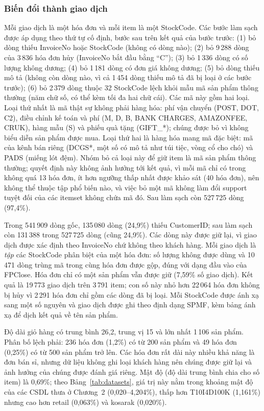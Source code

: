 \subsubsection{Biến đổi thành giao dịch}
Mỗi giao dịch là một hóa đơn và mỗi item là một StockCode. Các bước làm sạch được áp dụng theo thứ tự cố định, bước sau
trên kết quả của bước trước: (1) bỏ dòng thiếu InvoiceNo hoặc StockCode (không có dòng nào); (2) bỏ 9\,288 dòng của
3\,836 hóa đơn hủy (InvoiceNo bắt đầu bằng ``C''); (3) bỏ 1\,336 dòng có số lượng không dương; (4) bỏ 1\,181 dòng có
đơn giá không dương; (5) bỏ dòng thiếu mô tả (không còn dòng nào, vì cả 1\,454 dòng thiếu mô tả đã bị loại ở các bước
trước); (6) bỏ 2\,379 dòng thuộc 32 StockCode lệch khỏi mẫu mã sản phẩm thông thường (năm chữ số, có thể kèm tối đa
hai chữ cái). Các mã này gồm hai loại. Loại thứ nhất là mã thật sự không phải hàng hóa: phí vận chuyển (POST, DOT, C2),
điều chỉnh kế toán và phí (M, D, B, BANK CHARGES, AMAZONFEE, CRUK), hàng mẫu (S) và phiếu quà tặng (GIFT\_*); chúng
được bỏ vì không biểu diễn sản phẩm được mua. Loại thứ hai là hàng hóa mang mã đặc biệt: mã của kênh bán riêng (DCGS*,
một số có mô tả như túi tiệc, vòng cổ cho chó) và PADS (miếng lót đệm). Nhóm bỏ cả loại này để giữ item là mã sản phẩm
thông thường; quyết định này không ảnh hưởng tới kết quả, vì mỗi mã chỉ có trong không quá 13 hóa đơn, ít hơn ngưỡng
thấp nhất được khảo sát (40 hóa đơn), nên không thể thuộc tập phổ biến nào, và việc bỏ một mã không làm đổi support tuyệt
đối của các itemset không chứa mã đó. Sau làm sạch còn 527\,725 dòng (97,4\%).

Trong 541\,909 dòng gốc, 135\,080 dòng (24,9\%) thiếu CustomerID; sau làm sạch còn 131\,388 trong 527\,725 dòng (cũng
24,9\%). Các dòng này được giữ lại, vì giao dịch được xác định theo InvoiceNo chứ không theo khách hàng. Mỗi giao dịch là \emph{tập} các StockCode phân biệt của một hóa đơn: số lượng không được dùng và 10\,471 dòng trùng
mã trong cùng hóa đơn được gộp, đúng với dạng đầu vào của FPClose. Hóa đơn chỉ có một sản phẩm vẫn được giữ (7,59\% số
giao dịch). Kết quả là 19\,773 giao dịch trên 3\,791 item; con số này nhỏ hơn 22\,064 hóa đơn không bị hủy vì 2\,291
hóa đơn chỉ gồm các dòng đã bị loại. Mỗi StockCode được ánh xạ sang một số nguyên và giao dịch được ghi theo định dạng
SPMF, kèm bảng ánh xạ để dịch kết quả về tên sản phẩm.

Độ dài giỏ hàng có trung bình 26,2, trung vị 15 và lớn nhất 1\,106 sản phẩm. Phân bố lệch phải: 236 hóa đơn (1,2\%) có
từ 200 sản phẩm và 49 hóa đơn (0,25\%) có từ 500 sản phẩm trở lên. Các hóa đơn rất dài này nhiều khả năng là đơn bán
sỉ, nhưng dữ liệu không ghi loại khách hàng nên chúng được giữ lại và ảnh hưởng của chúng được đánh giá riêng. Mật độ
(độ dài trung bình chia cho số item) là 0,69\%; theo Bảng~\ref{tab:datasets}, giá trị này nằm trong khoảng mật độ của
các CSDL thưa ở Chương~2 (0,020--4,204\%), thấp hơn T10I4D100K (1,161\%) nhưng cao hơn retail (0,063\%) và kosarak
(0,020\%).

